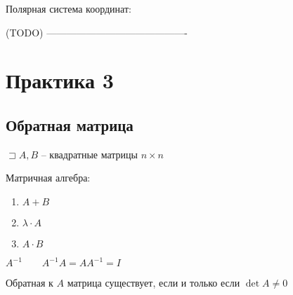 \documentclass{book}
\theoremstyle{definition}
\begin{document}
      Полярная система координат:



      (TODO)
      -------------------------------------------
      \section{Практика 3}

      \subsection{Обратная матрица}

      $\sqsupset A,B$ -- квадратные матрицы $n\times n$ 

      Матричная алгебра:
      \begin{enumerate}
          \item $A+B$
          \item  $\lambda\cdot A$
          \item $A\cdot  B$
      \end{enumerate}
        \begin{definition}
      $A^{-1}\qquad A^{-1}A = A A^{-1} = I$
        \end{definition}
      \begin{statement}
          Обратная к $A$ матрица существует, если и только если  $\det A \neq 0$
      \end{statement}
   
\end{document}
